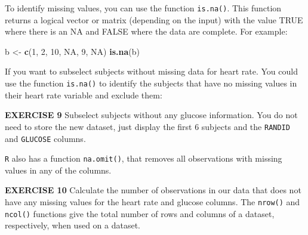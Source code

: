 \documentclass[
]{article}
\newenvironment{Shaded}{\begin{snugshade}}{\end{snugshade}}
\newcommand{\CommentTok}[1]{\textcolor[rgb]{0.56,0.35,0.01}{\textit{#1}}}
\newcommand{\DecValTok}[1]{\textcolor[rgb]{0.00,0.00,0.81}{#1}}
\newcommand{\KeywordTok}[1]{\textcolor[rgb]{0.13,0.29,0.53}{\textbf{#1}}}
\newcommand{\NormalTok}[1]{#1}
\newcommand{\OperatorTok}[1]{\textcolor[rgb]{0.81,0.36,0.00}{\textbf{#1}}}
\newcommand{\OtherTok}[1]{\textcolor[rgb]{0.56,0.35,0.01}{#1}}
\newcommand{\StringTok}[1]{\textcolor[rgb]{0.31,0.60,0.02}{#1}}
\begin{document}
To identify missing values, you can use the function \texttt{is.na()}.
This function returns a logical vector or matrix (depending on the
input) with the value TRUE where there is an NA and FALSE where the data
are complete. For example:

\begin{Shaded}
\begin{Highlighting}[]
\NormalTok{b <-}\StringTok{ }\KeywordTok{c}\NormalTok{(}\DecValTok{1}\NormalTok{, }\DecValTok{2}\NormalTok{, }\DecValTok{10}\NormalTok{, }\OtherTok{NA}\NormalTok{, }\DecValTok{9}\NormalTok{, }\OtherTok{NA}\NormalTok{)}
\KeywordTok{is.na}\NormalTok{(b)}
\end{Highlighting}
\end{Shaded}

If you want to subselect subjects without missing data for heart rate.
You could use the function \texttt{is.na()} to identify the subjects
that have no missing values in their heart rate variable and exclude
them:

\begin{Shaded}
\end{Shaded}

\textbf{EXERCISE 9} Subselect subjects without any glucose information.
You do not need to store the new dataset, just display the first 6
subjects and the \texttt{RANDID} and \texttt{GLUCOSE} columns.

\begin{Shaded}
\end{Shaded}

\texttt{R} also has a function \texttt{na.omit()}, that removes all
observations with missing values in any of the columns.

\textbf{EXERCISE 10} Calculate the number of observations in our data
that does not have any missing values for the heart rate and glucose
columns. The \texttt{nrow()} and \texttt{ncol()} functions give the
total number of rows and columns of a dataset, respectively, when used
on a dataset.
\end{document}
